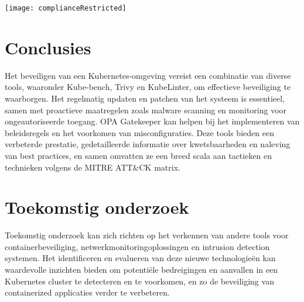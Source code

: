 \documentclass[a0,portrait]{hogent-poster}
\begin{document}
\begin{multicols}{2}
\begin{center}
    \captionsetup{type=figure}
    \texttt{[image: complianceRestricted]}
\end{center}

\section{Conclusies}

Het beveiligen van een Kubernetes-omgeving vereist een combinatie van diverse tools, waaronder Kube-bench, Trivy en KubeLinter, om effectieve beveiliging te waarborgen. Het regelmatig updaten en patchen van het systeem is essentieel, samen met proactieve maatregelen zoals malware scanning en monitoring voor ongeautoriseerde toegang. OPA Gatekeeper kan helpen bij het implementeren van beleidsregels en het voorkomen van misconfiguraties. Deze tools bieden een verbeterde prestatie, gedetailleerde informatie over kwetsbaarheden en naleving van best practices, en samen omvatten ze een breed scala aan tactieken en technieken volgens de MITRE ATT\&CK matrix.

\section{Toekomstig onderzoek}

Toekomstig onderzoek kan zich richten op het verkennen van andere tools voor containerbeveiliging, netwerkmonitoringoplossingen en intrusion detection systemen. Het identificeren en evalueren van deze nieuwe technologieën kan waardevolle inzichten bieden om potentiële bedreigingen en aanvallen in een Kubernetes cluster te detecteren en te voorkomen, en zo de beveiliging van containerized applicaties verder te verbeteren.

\end{multicols}
\end{document}
